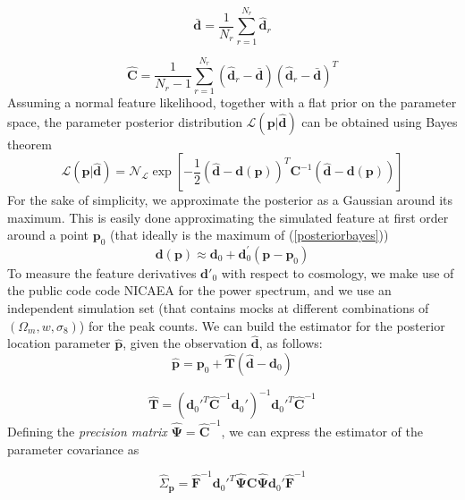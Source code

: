 \documentclass[reprint,aps,prd,superscriptaddress,showkeys,showpacs]{revtex4-1}
\newcommand{\bb}[1]{\mathbf{#1}}
\newcommand{\bbh}[1]{\mathbf{\hat{#1}}}
\newcommand{\h}[1]{\hat{#1}}
\begin{document}
\begin{equation}
\bb{\bar{d}} = \frac{1}{N_r}\sum_{r=1}^{N_r} \bbh{d}_r
\end{equation}

\begin{equation}
\label{covest}
\bbh{C} = \frac{1}{N_r-1}\sum_{r=1}^{N_r} (\bbh{d}_r - \bar{\bb{d}}) (\bbh{d}_r - \bar{\bb{d}})^T
\end{equation}
%
Assuming a normal feature likelihood, together with a flat prior on the parameter space, the parameter posterior distribution $\mathcal{L}(\bb{p}\vert\bbh{d})$ can be obtained using Bayes theorem
\begin{equation}
\label{posteriorbayes}
\mathcal{L}(\bb{p}\vert\bbh{d}) = \mathcal{N}_\mathcal{L}\exp{\left[-\frac{1}{2}(\bbh{d}-\bb{d}(\bb{p}))^T\bb{C}^{-1}(\bbh{d}-\bb{d}(\bb{p}))\right]}
\end{equation}
%
For the sake of simplicity, we approximate the posterior as a Gaussian around its maximum. This is easily done approximating the simulated feature at first order around a point $\bb{p}_0$ (that ideally is the maximum of (\ref{posteriorbayes}))
\begin{equation}
\bb{d}(\bb{p}) \approx \bb{d}_0 + \bb{d}_0^\prime(\bb{p}-\bb{p}_0) 
\end{equation}
%
To measure the feature derivatives $\bb{d}'_0$ with respect to cosmology, we make use of the public code code NICAEA \citep{Nicaea} for the power spectrum, and we use an independent simulation set (that contains mocks at different combinations of $(\Omega_m,w,\sigma_8)$) for the peak counts.
We can build the estimator for the posterior location parameter $\bbh{p}$, given the observation $\bbh{d}$, as follows:
%
\begin{equation}
\label{estimatormean}
\bbh{p} = \bb{p}_0 + \bbh{T}(\bbh{d}-\bb{d}_0)
\end{equation}

\begin{equation}
\bbh{T} = (\bb{d}_0'^T\bbh{C}^{-1}\bb{d}_0')^{-1}\bb{d}_0'^T\bbh{C}^{-1}
\end{equation}
%
Defining the \textit{precision matrix} $\bbh{\Psi}=\bbh{C}^{-1}$, we can express the estimator of the parameter covariance as 

\begin{equation}
\label{estimatorcovariance}
\h{\Sigma}_\bb{p} = \bbh{F}^{-1}\bb{d}_0'^T\bbh{\Psi}\bb{C}\bbh{\Psi}\bb{d}_0'\bbh{F}^{-1}
\end{equation}
\end{document}
